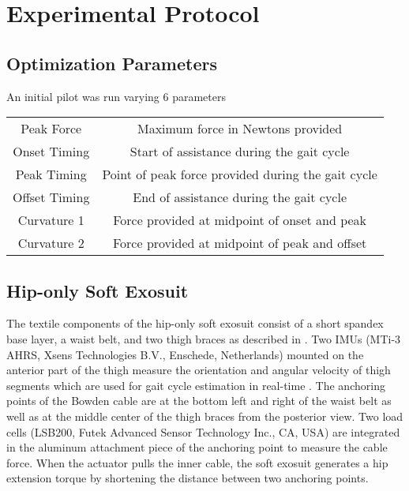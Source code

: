 \section{Experimental Protocol}
\subsection{Optimization Parameters}
An initial pilot was run varying 6 parameters
\begin{table}[h]
  \centering
  \begin{tabular}{ c c }
  Peak Force & Maximum force in Newtons provided\\
  Onset Timing & Start of assistance during the gait cycle\\
  Peak Timing & Point of peak force provided during the gait cycle\\
  Offset Timing & End of assistance during the gait cycle\\
  Curvature 1 & Force provided at midpoint of onset and peak\\
  Curvature 2 & Force provided at midpoint of peak and offset
  \end{tabular}
\end{table}

\subsection{Hip-only Soft Exosuit}
The textile components of the hip-only soft exosuit consist of a short spandex base layer, a waist belt, and two thigh braces as described in \citep{Lee2018}. Two IMUs (MTi-3 AHRS, Xsens Technologies B.V., Enschede, Netherlands) mounted on the anterior part of the thigh measure the orientation and angular velocity of thigh segments which are used for gait cycle estimation in real-time \citep{Ding2016}. The anchoring points of the Bowden cable are at the bottom left and right of the waist belt as well as at the middle center of the thigh braces from the posterior view. Two load cells (LSB200, Futek Advanced Sensor Technology Inc., CA, USA) are integrated in the aluminum attachment piece of the anchoring point to measure the cable force. When the actuator pulls the inner cable, the soft exosuit generates a hip extension torque by shortening the distance between two anchoring points. 

